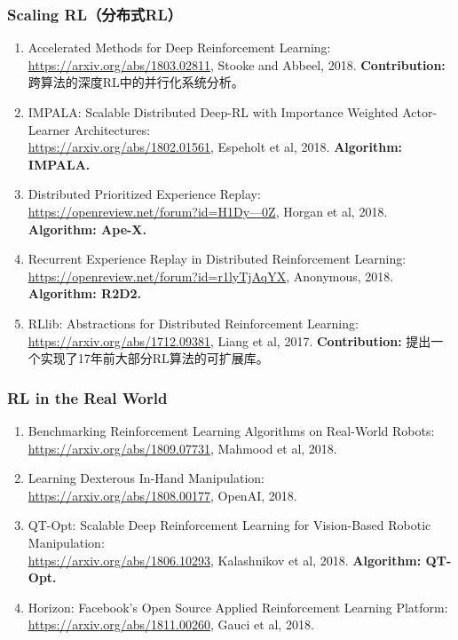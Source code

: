 \documentclass[lang=cn,11pt,a4paper]{elegant_template}
\begin{document}
\subsubsection{Scaling RL（分布式RL）}
\begin{enumerate}
\item Accelerated Methods for Deep Reinforcement Learning:\\ \href{https://arxiv.org/abs/1803.02811}{https://arxiv.org/abs/1803.02811}, Stooke and Abbeel, 2018. \textbf{Contribution:} 跨算法的深度RL中的并行化系统分析。
\item IMPALA: Scalable Distributed Deep-RL with Importance Weighted Actor-Learner Architectures:\\ \href{https://arxiv.org/abs/1802.01561}{https://arxiv.org/abs/1802.01561}, Espeholt et al, 2018. \textbf{Algorithm: IMPALA.}
\item Distributed Prioritized Experience Replay:\\ \href{https://openreview.net/forum?id=H1Dy---0Z}{https://openreview.net/forum?id=H1Dy---0Z}, Horgan et al, 2018. \textbf{Algorithm: Ape-X.}
\item Recurrent Experience Replay in Distributed Reinforcement Learning:\\ \href{https://openreview.net/forum?id=r1lyTjAqYX}{https://openreview.net/forum?id=r1lyTjAqYX}, Anonymous, 2018. \textbf{Algorithm: R2D2.}
\item RLlib: Abstractions for Distributed Reinforcement Learning:\\ \href{https://arxiv.org/abs/1712.09381}{https://arxiv.org/abs/1712.09381}, Liang et al, 2017. \textbf{Contribution:} 提出一个实现了17年前大部分RL算法的可扩展库。
\end{enumerate}


\subsubsection{RL in the Real World}
\begin{enumerate}
\item Benchmarking Reinforcement Learning Algorithms on Real-World Robots:\\ \href{https://arxiv.org/abs/1809.07731}{https://arxiv.org/abs/1809.07731}, Mahmood et al, 2018.
\item Learning Dexterous In-Hand Manipulation:\\ \href{https://arxiv.org/abs/1808.00177}{https://arxiv.org/abs/1808.00177}, OpenAI, 2018.
\item QT-Opt: Scalable Deep Reinforcement Learning for Vision-Based Robotic Manipulation:\\ \href{https://arxiv.org/abs/1806.10293}{https://arxiv.org/abs/1806.10293}, Kalashnikov et al, 2018. \textbf{Algorithm: QT-Opt.}
\item Horizon: Facebook’s Open Source Applied Reinforcement Learning Platform:\\ \href{https://arxiv.org/abs/1811.00260}{https://arxiv.org/abs/1811.00260}, Gauci et al, 2018.
\end{enumerate}
\end{document}
